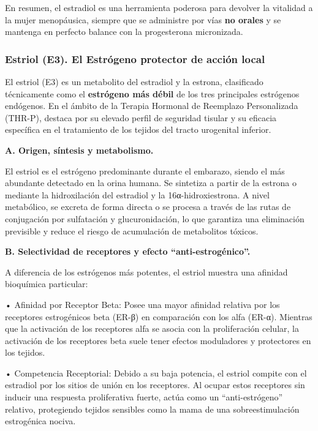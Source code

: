 \documentclass[
  spanish,
]{article}
\begin{document}
En resumen, el estradiol es una herramienta poderosa para devolver la vitalidad a la mujer menopáusica, siempre que se administre por vías \textbf{no orales} y se mantenga en perfecto balance con la progesterona micronizada.

\subsubsection{Estriol (E3). El Estrógeno protector de acción local}\label{estriol-e3.-el-estruxf3geno-protector-de-acciuxf3n-local}

El estriol (E3) es un metabolito del estradiol y la estrona, clasificado técnicamente como el \textbf{estrógeno más débil} de los tres principales estrógenos endógenos. En el ámbito de la Terapia Hormonal de Reemplazo Personalizada (THR-P), destaca por su elevado perfil de seguridad tisular y su eficacia específica en el tratamiento de los tejidos del tracto urogenital inferior.

\textbf{A. Origen, síntesis y metabolismo.}

El estriol es el estrógeno predominante durante el embarazo, siendo el más abundante detectado en la orina humana. Se sintetiza a partir de la estrona o mediante la hidroxilación del estradiol y la 16α-hidroxiestrona. A nivel metabólico, se excreta de forma directa o se procesa a través de las rutas de conjugación por sulfatación y glucuronidación, lo que garantiza una eliminación previsible y reduce el riesgo de acumulación de metabolitos tóxicos.

\textbf{B. Selectividad de receptores y efecto ``anti-estrogénico''.}

A diferencia de los estrógenos más potentes, el estriol muestra una afinidad bioquímica particular:

• Afinidad por Receptor Beta: Posee una mayor afinidad relativa por los receptores estrogénicos beta (ER-β) en comparación con los alfa (ER-α). Mientras que la activación de los receptores alfa se asocia con la proliferación celular, la activación de los receptores beta suele tener efectos moduladores y protectores en los tejidos.

• Competencia Receptorial: Debido a su baja potencia, el estriol compite con el estradiol por los sitios de unión en los receptores. Al ocupar estos receptores sin inducir una respuesta proliferativa fuerte, actúa como un ``anti-estrógeno'' relativo, protegiendo tejidos sensibles como la mama de una sobreestimulación estrogénica nociva.
\end{document}
